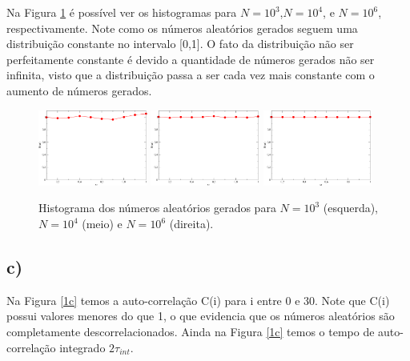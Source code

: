 \documentclass[a4wide]{report}
\begin{document}
Na Figura \ref{1b} é possível ver os histogramas para $N =10^3$,$N =10^4$, e $N =10^6$, respectivamente. Note como os números aleatórios gerados seguem uma distribuição constante no intervalo [0,1]. O fato da distribuição não ser perfeitamente constante é devido a quantidade de números gerados não ser infinita, visto que a distribuição passa a ser cada vez mais constante com o aumento de números gerados. 


\begin{figure}[!htb]
\centering
\includegraphics[width=0.32\textwidth]{103.pdf}
\includegraphics[width=0.32\textwidth]{104.pdf}
\includegraphics[width=0.32\textwidth]{106.pdf}
\caption{Histograma dos números aleatórios gerados para $N =10^3$ (esquerda),$N =10^4$ (meio) e $N =10^6$ (direita).}
\label{1b}
\end{figure}

\subsection*{c) }

Na Figura \ref{1c} temos a auto-correlação C(i) para i entre 0 e 30. Note que C(i) possui valores menores do que 1, o que evidencia que os números aleatórios são completamente descorrelacionados. Ainda na Figura \ref{1c} temos o tempo de auto-correlação integrado $2\tau_{int}$.
\end{document}
